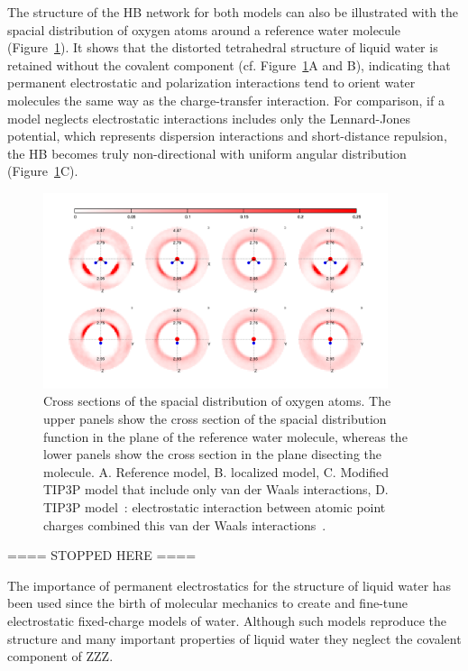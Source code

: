 \documentclass[prl,twocolumn,showpacs]{revtex4}
\begin{document}
The structure of the HB network for both models can also be illustrated with the spacial distribution of oxygen atoms around a reference water molecule (Figure~\ref{Fig:SDF}). It shows that the distorted tetrahedral structure of liquid water is retained without the covalent component (cf. Figure~\ref{Fig:SDF}A and B), indicating that permanent electrostatic and polarization interactions tend to orient water molecules the same way as the charge-transfer interaction. For comparison, if a model neglects electrostatic interactions includes only the Lennard-Jones potential, which represents dispersion interactions and short-distance repulsion, the HB becomes truly non-directional with uniform angular distribution (Figure~\ref{Fig:SDF}C). 

\begin{figure}
\includegraphics[width=0.9\textwidth]{SDF}
\caption{Cross sections of the spacial distribution of oxygen atoms. The upper panels show the cross section of the spacial distribution function in the plane of the reference water molecule, whereas the lower panels show the cross section in the plane disecting the molecule. A. Reference model, B. localized model, C. Modified TIP3P model that include only van der Waals interactions, D. TIP3P model~\cite{TIP3P}: electrostatic interaction between atomic point charges combined this van der Waals interactions~\cite{TIP3P}.} \label{Fig:SDF}
\end{figure}

==== STOPPED HERE ====

The importance of permanent electrostatics for the structure of liquid water has been used since the birth of molecular mechanics to create and fine-tune electrostatic fixed-charge models of water. Although such models reproduce the structure and many important properties of liquid water they neglect the covalent component of ZZZ.
\end{document}
